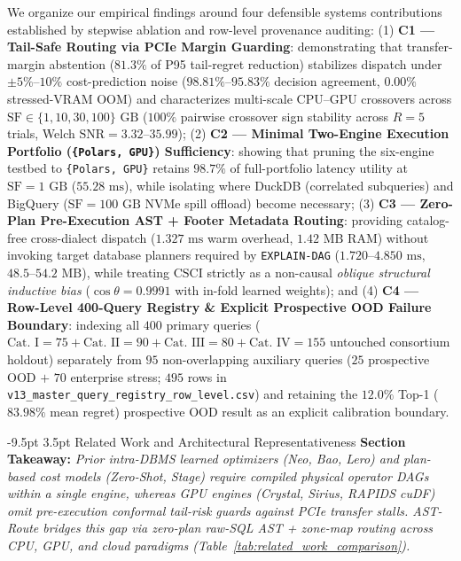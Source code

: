 \documentclass[10pt,a4paper]{article}
\makeatletter
\renewcommand\section{\@startsection{section}{1}{\z@}%
  {-9.5pt \@plus -2pt \@minus -1.5pt}%
  {3.5pt \@plus 1pt}%
  {\normalfont\large\bfseries}}
\makeatother
\begin{document}

We organize our empirical findings around four defensible systems contributions established by stepwise ablation and row-level provenance auditing:
(1) \textbf{C1 --- Tail-Safe Routing via PCIe Margin Guarding}: demonstrating that transfer-margin abstention ($81.3\%$ of P95 tail-regret reduction) stabilizes dispatch under $\pm 5\%\text{--}10\%$ cost-prediction noise ($98.81\%\text{--}95.83\%$ decision agreement, $0.00\%$ stressed-VRAM OOM) and characterizes multi-scale CPU--GPU crossovers across $\text{SF}\in\{1,10,30,100\}\text{ GB}$ ($100\%$ pairwise crossover sign stability across $R=5$ trials, Welch $\text{SNR}=3.32\text{--}35.99$);
(2) \textbf{C2 --- Minimal Two-Engine Execution Portfolio (\texttt{\{Polars, GPU\}}) Sufficiency}: showing that pruning the six-engine testbed to \texttt{\{Polars, GPU\}} retains $98.7\%$ of full-portfolio latency utility at $\text{SF}=1\text{ GB}$ ($55.28\text{ ms}$), while isolating where DuckDB (correlated subqueries) and BigQuery ($\text{SF}=100\text{ GB}$ NVMe spill offload) become necessary;
(3) \textbf{C3 --- Zero-Plan Pre-Execution AST + Footer Metadata Routing}: providing catalog-free cross-dialect dispatch ($1.327\text{ ms}$ warm overhead, $1.42\text{ MB}$ RAM) without invoking target database planners required by \texttt{EXPLAIN-DAG} ($1.720\text{--}4.850\text{ ms}$, $48.5\text{--}54.2\text{ MB}$), while treating $\text{CSCI}$ strictly as a non-causal \emph{oblique structural inductive bias} ($\cos\theta=0.9991$ with in-fold learned weights); and
(4) \textbf{C4 --- Row-Level 400-Query Registry \& Explicit Prospective OOD Failure Boundary}: indexing all $400$ primary queries ($\text{Cat.~I}=75 + \text{Cat.~II}=90 + \text{Cat.~III}=80 + \text{Cat.~IV}=155$ untouched consortium holdout) separately from $95$ non-overlapping auxiliary queries ($25$ prospective OOD $+$ $70$ enterprise stress; $495$ rows in \texttt{v13\_\allowbreak{}master\_\allowbreak{}query\_\allowbreak{}registry\_\allowbreak{}row\_\allowbreak{}level.csv}) and retaining the $12.0\%$ Top-1 ($83.98\%$ mean regret) prospective OOD result as an explicit calibration boundary.

\section{Related Work and Architectural Representativeness}
\noindent\textbf{Section Takeaway:} \emph{Prior intra-DBMS learned optimizers (Neo, Bao, Lero) and plan-based cost models (Zero-Shot, Stage) require compiled physical operator DAGs within a single engine, whereas GPU engines (Crystal, Sirius, RAPIDS cuDF) omit pre-execution conformal tail-risk guards against PCIe transfer stalls. AST-Route bridges this gap via zero-plan raw-SQL AST + zone-map routing across CPU, GPU, and cloud paradigms (Table~\ref{tab:related_work_comparison}).}\par\vspace{2pt}
\end{document}
